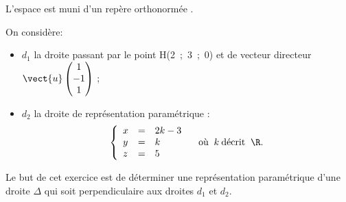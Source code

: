 \medskip

L'espace est muni d'un repère orthonormée \Oijk.

On considère:
\begin{itemize}
\item[$\bullet~~$]$d_1$ la droite passant par le point H(2~;~3~;~0) et de vecteur directeur $\vect{u}\begin{pmatrix}1\\-1\\1\end{pmatrix}$ ;
\item[$\bullet~~$]$d_2$  la droite de représentation paramétrique :
\[\left\{\begin{array}{l c l}
x &=& 2k - 3\\
y &=&k\\
z &=&5
\end{array}\right. \quad \text{où }\:k \:\text{décrit }\: \R.\]
\end{itemize}

\medskip

Le but de cet exercice est de déterminer une représentation paramétrique d'une droite $\Delta$ qui soit perpendiculaire aux droites $d_1$ et $d_2$.

\medskip

